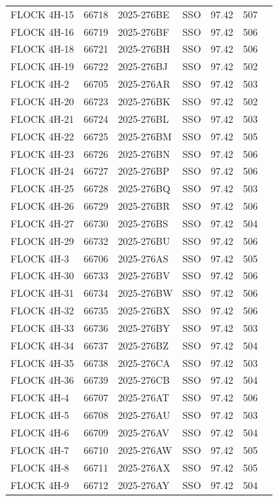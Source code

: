 \begin{longtable}{p{3.5cm}lllccc}
FLOCK 4H-15 & 66718 & 2025-276BE & SSO & 97.42 & 507 \\
FLOCK 4H-16 & 66719 & 2025-276BF & SSO & 97.42 & 506 \\
FLOCK 4H-18 & 66721 & 2025-276BH & SSO & 97.42 & 506 \\
FLOCK 4H-19 & 66722 & 2025-276BJ & SSO & 97.42 & 502 \\
FLOCK 4H-2 & 66705 & 2025-276AR & SSO & 97.42 & 503 \\
FLOCK 4H-20 & 66723 & 2025-276BK & SSO & 97.42 & 502 \\
FLOCK 4H-21 & 66724 & 2025-276BL & SSO & 97.42 & 503 \\
FLOCK 4H-22 & 66725 & 2025-276BM & SSO & 97.42 & 505 \\
FLOCK 4H-23 & 66726 & 2025-276BN & SSO & 97.42 & 506 \\
FLOCK 4H-24 & 66727 & 2025-276BP & SSO & 97.42 & 506 \\
FLOCK 4H-25 & 66728 & 2025-276BQ & SSO & 97.42 & 503 \\
FLOCK 4H-26 & 66729 & 2025-276BR & SSO & 97.42 & 506 \\
FLOCK 4H-27 & 66730 & 2025-276BS & SSO & 97.42 & 504 \\
FLOCK 4H-29 & 66732 & 2025-276BU & SSO & 97.42 & 506 \\
FLOCK 4H-3 & 66706 & 2025-276AS & SSO & 97.42 & 505 \\
FLOCK 4H-30 & 66733 & 2025-276BV & SSO & 97.42 & 506 \\
FLOCK 4H-31 & 66734 & 2025-276BW & SSO & 97.42 & 506 \\
FLOCK 4H-32 & 66735 & 2025-276BX & SSO & 97.42 & 506 \\
FLOCK 4H-33 & 66736 & 2025-276BY & SSO & 97.42 & 503 \\
FLOCK 4H-34 & 66737 & 2025-276BZ & SSO & 97.42 & 504 \\
FLOCK 4H-35 & 66738 & 2025-276CA & SSO & 97.42 & 503 \\
FLOCK 4H-36 & 66739 & 2025-276CB & SSO & 97.42 & 504 \\
FLOCK 4H-4 & 66707 & 2025-276AT & SSO & 97.42 & 506 \\
FLOCK 4H-5 & 66708 & 2025-276AU & SSO & 97.42 & 503 \\
FLOCK 4H-6 & 66709 & 2025-276AV & SSO & 97.42 & 504 \\
FLOCK 4H-7 & 66710 & 2025-276AW & SSO & 97.42 & 505 \\
FLOCK 4H-8 & 66711 & 2025-276AX & SSO & 97.42 & 505 \\
FLOCK 4H-9 & 66712 & 2025-276AY & SSO & 97.42 & 504 \\

\end{longtable}
